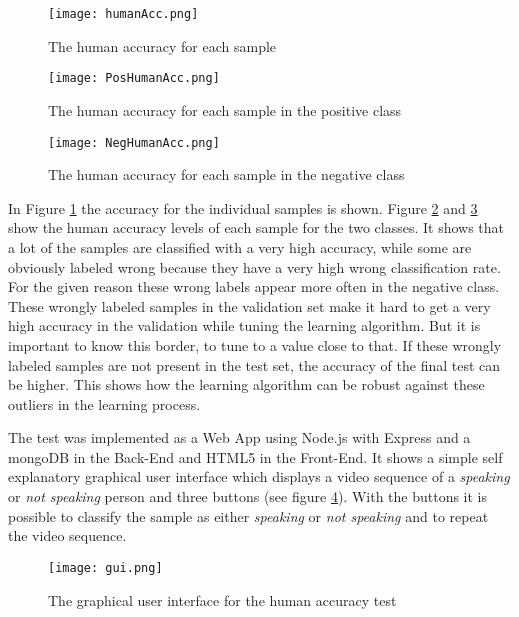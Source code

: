 \begin{figure}
  \centering
  \texttt{[image: humanAcc.png]}
  \caption{The human accuracy for each sample}
  \label{fig:humanAcc}
\end{figure}

\begin{figure}
  \centering
  \texttt{[image: PosHumanAcc.png]}
  \caption{The human accuracy for each sample in the positive class}
  \label{fig:PosHumanAcc}
\end{figure}

\begin{figure}
  \centering
  \texttt{[image: NegHumanAcc.png]}
  \caption{The human accuracy for each sample in the negative class}
  \label{fig:NegHumanAcc}
\end{figure}

In Figure \ref{fig:humanAcc} the accuracy for the individual samples is shown. Figure \ref{fig:PosHumanAcc} and \ref{fig:NegHumanAcc} show the human accuracy levels of each sample for the two classes.
It shows that a lot of the samples are classified with a very high accuracy, while some are obviously labeled wrong because they have a very high wrong classification rate. For the given reason these wrong labels appear more often in the negative class.
These wrongly labeled samples in the validation set make it hard to get a very high accuracy in the validation while tuning the learning algorithm.
But it is important to know this border, to tune to a value close to that.
If these wrongly labeled samples are not present in the test set, the accuracy of the final test can be higher. 
This shows how the learning algorithm can be robust against these outliers in the learning process. 

The test was implemented as a Web App using Node.js\cite{NODE} with Express\cite{EXPRESS} and a mongoDB\cite{MONGO} in the Back-End and HTML5 in the Front-End.
It shows a simple self explanatory graphical user interface which displays a video sequence of a \emph{speaking} or \emph{not speaking} person and three buttons (see figure \ref{fig:gui}). 
With the buttons it is possible to classify the sample as either \emph{speaking} or \emph{not speaking} and to repeat the video sequence.

\begin{figure}
  \centering
  \texttt{[image: gui.png]}
  \caption{The graphical user interface for the human accuracy test}
  \label{fig:gui}
\end{figure}



